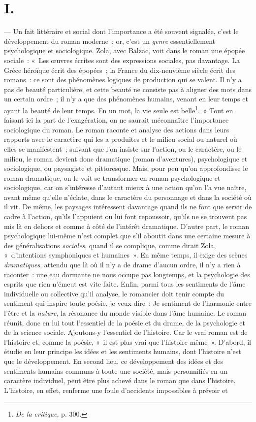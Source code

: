 \documentclass[french,twoside]{book} %
\begin{document}
\section[{I.}]{I.}
\noindent — Un fait littéraire et social dont l’importance a été souvent signalée, c’est le développement du roman moderne ; or, c’est un \emph{genre} essentiellement psychologique et sociologique. Zola, avec Balzac, voit dans le roman une épopée sociale : « Les œuvres écrites sont des expressions sociales, pas davantage. La Grèce héroïque écrit des épopées ; la France du dix-neuvième siècle écrit des romans : ce sont des phénomènes logiques de production qui se valent. Il n’y a pas de beauté particulière, et cette beauté ne consiste pas à aligner des mots dans un certain ordre ; il n’y a que des phénomènes humains, venant en leur temps et ayant la beauté de leur temps. En un mot, la vie seule est belle\footnote{\emph{De la critique}, p. 300.}. » Tout en faisant ici la part de l’exagération, on ne saurait méconnaître l’importance sociologique du roman. Le roman raconte et analyse des actions dans leurs rapports avec le caractère qui les a produites et le milieu social ou naturel où elles se manifestent ; suivant que l’on insiste sur l’action, ou le caractère, ou le milieu, le roman devient donc dramatique (roman d’aventures), psychologique et sociologique, ou paysagiste et pittoresque. Mais, pour peu qu’on approfondisse le roman dramatique, on le voit se transformer en roman psychologique et sociologique, car on s’intéresse d’autant mieux à une action qu’on l’a vue naître, avant même qu’elle n’éclate, dans le caractère du personnage et dans la société où il vit. De même, les paysages intéressent davantage quand ils ne font que servir de cadre à l’action, qu’ils l’appuient ou lui font repoussoir, qu’ils ne se trouvent pas mis là en dehors et comme à côté de l’intérêt dramatique. D’autre part, le roman psychologique lui-même n’est complet que s’il aboutit dans une certaine mesure à des généralisations \emph{sociales}, quand il se complique, comme dirait Zola, « d’intentions symphoniques et humaines ». En même temps, il exige des scènes \emph{dramatiques}, attendu que là où il n’y a de drame d’aucun ordre, il n’y a rien à raconter : une eau dormante ne nous occupe pas longtemps, et la psychologie des esprits que rien n’émeut est vite faite. Enfin, parmi tous les sentiments de l’âme individuelle ou collective qu’il analyse, le romancier doit tenir compte du sentiment qui inspire toute poésie, je veux dire : Je sentiment de l’harmonie entre l’être et la \emph{nature}, la résonance du monde visible dans l’âme humaine. Le roman réunit, donc en lui tout l’essentiel de la poésie et du drame, de la psychologie et de la science sociale. Ajoutons-y l’essentiel de l’histoire. Car le vrai roman est de l’histoire et, comme la poésie, « il est plus vrai que l’histoire même ». D’abord, il étudie en leur principe les idées et les sentiments humains, dont l’histoire n’est que le développement. En second lieu, ce développement des idées et des sentiments humains communs à toute une société, mais personnifiés en un caractère individuel, peut être plus achevé dans le roman que dans l’histoire. L’histoire, en effet, renferme une foule d’accidents impossibles à prévoir et 
\end{document}
